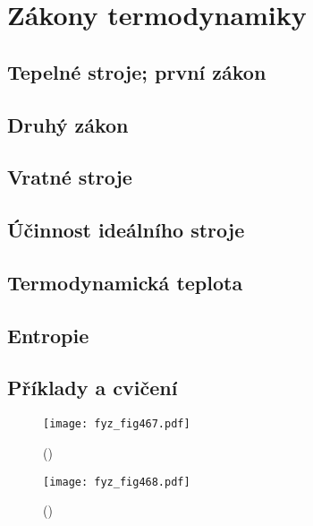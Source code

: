 {
\chapter{Zákony termodynamiky}\label{fyz:IchapXLIV}
\minitoc
  \section{Tepelné stroje; první zákon}\label{fyz:IchapXLIVsecI}
  \section{Druhý zákon}\label{fyz:IchapXLIVsecII}
  \section{Vratné stroje}\label{fyz:IchapXLIVsecIII}
  \section{Účinnost ideálního stroje}\label{fyz:IchapXLIVsecIV}
  \section{Termodynamická teplota}\label{fyz:IchapXLIVsecV}
  \section{Entropie}\label{fyz:IchapXLIVsecVI}
  \section{Příklady a cvičení}\label{fyz:IchapXLIVsecVII}

    \begin{figure}[ht!] %
      \centering
      \texttt{[image: fyz\_fig467.pdf]}
      \caption{ 
               (\cite[s.~707]{Feynman01})}
      \label{fyz_fig467}
    \end{figure}

    \begin{figure}[ht!] %
      \centering
      \texttt{[image: fyz\_fig468.pdf]}
      \caption{ 
               (\cite[s.~707]{Feynman01})}
      \label{fyz_fig468}
    \end{figure}

}
